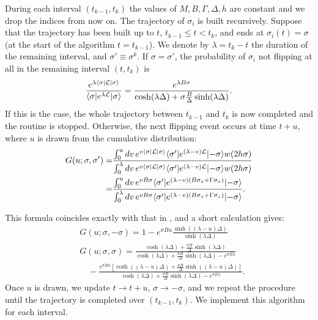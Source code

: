\documentclass[aps,twocolumn,floats,pre,amsmath,superscriptaddress]{revtex4}
\newcommand{\beq}{\begin{equation}}
\newcommand{\eeq}{\end{equation}}
\let\s=\sigma \let\t=\tau \let\f=\varphi \let\ph=\varphi\let\c=\chi
\def\to{\rightarrow} \def\la{\langle} \def\ra{\rangle}
\newcommand{\bra}[1]{\langle{#1}|}
\newcommand{\ket}[1]{|{#1}\rangle{}}
\newcommand{\<}{\langle}
\renewcommand{\>}{\rangle}
\begin{document}
During each interval $(t_{k-1},t_k)$ the values of $M, B, \Gamma,
\Delta, h$ are constant and we drop the indices from now on.
The trajectory of $\sigma_i$ is built recursively. Suppose that the
trajectory has been built up to $t$, $t_{k-1}\leq t<t_k$, and ends at
$\sigma_i(t)= \sigma$ (at the start of the algorithm $t=t_{k-1}$).
We denote by $\lambda=t_k-t$ the duration of the remaining interval, and
$\sigma'\equiv \sigma^k$.
If $\s=\s'$, the probability of $\s_i$ not flipping at all in the remaining interval
$(t,t_k)$ is
\beq\label{insideinterval1}
\frac{e^{\lambda \bra{\sigma}  {\cal L} \ket{\sigma} }}{  \bra{\sigma} e^{\lambda  {\cal L}} \ket{\sigma}  }= \frac{e^{\lambda B \sigma}}{ \cosh(\lambda\Delta) + \s \frac{B}{\Delta} 
\sinh(\lambda\Delta) }.
\eeq
If this is the case, the whole trajectory between $t_{k-1}$ and $t_k$
is now completed and the routine is stopped.
Otherwise, the next flipping event occurs at time $t+u$, where $u$ is
drawn from the cumulative distribution:
\beq\begin{split}
G(u; \sigma, \sigma') =& \frac{ \int_0^u dv \, e^{v  \bra{\sigma}  {\cal L} \ket{\sigma}} \bra{\sigma'} e^{(\lambda-v)  {\cal L}} \ket{-\sigma} w(2 h \sigma) }
{  \int_0^\lambda dv \, e^{v  \bra{\sigma}  {\cal L} \ket{\sigma}} \bra{\sigma'} e^{(\lambda-v)  {\cal L}} \ket{-\sigma}  w(2 h \sigma) }\\
=  &\frac{ \int_0^u dv \, e^{v  B \sigma } \bra{\sigma'} e^{(\lambda-v) ( B \sigma_z + \Gamma \sigma_x )   } \ket{-\sigma} }
 { \int_0^\lambda dv \, e^{v  B \sigma } \bra{\sigma'} e^{(\lambda-v)
     ( B \sigma_z + \Gamma \sigma_x )   } \ket{-\sigma} }.
\end{split}
\eeq

This formula coincides exactly with that in
\cite{francescoprb}, and a short calculation gives:
\beq\label{insideinterval2}\begin{split}
&G(u;\sigma,-\sigma) = 1 - e^{\sigma B u} \frac{\sinh( (\lambda-u) \Delta)}{\sinh( \lambda \Delta)} \\
 &G(u;\sigma,\sigma) = \frac{  
 \cosh( \lambda \Delta) + \frac{\sigma B}{\Delta} \sinh( \lambda \Delta)
}{  
 \cosh( \lambda \Delta) + \frac{\sigma B}{\Delta} \sinh( \lambda \Delta)
-e^{\sigma B \lambda}  }
\\ 
&\quad  -\frac{e^{\sigma B u} [ \cosh( (\lambda-u) \Delta) + \frac{\sigma B}{\Delta} \sinh( (\lambda-u) \Delta) ]}{  
 \cosh( \lambda \Delta) + \frac{\sigma B}{\Delta} \sinh( \lambda \Delta)
-e^{\sigma B \lambda} }.
\end{split}\eeq
Once $u$ is drawn, we update $t\to t+u$, $\sigma\to -\sigma$, and we
repeat the procedure until the trajectory is completed over
$(t_{k-1},t_k)$. We implement this algorithm for each interval.
\end{document}
